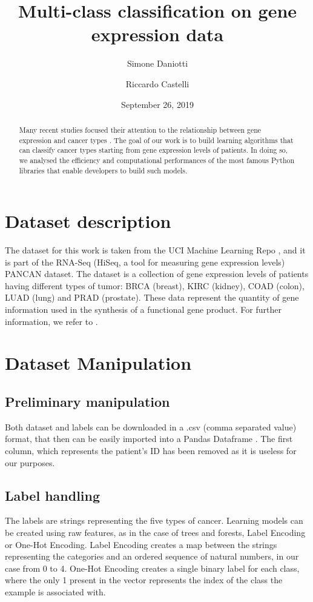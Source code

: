 \documentclass[12pt]{article}
\title{Multi-class classification on gene expression data}
\author[1]{Simone Daniotti}
\author[2]{Riccardo Castelli}
\affil[1]{Physics Department, University of Milan}
\affil[2]{Informatics Department, University of Milan}
\date{September 26, 2019}
\begin{document}
 \maketitle
  

\begin{abstract}
Many recent studies focused their attention to the relationship between gene expression and cancer types \cite{wang2018gene}. The goal of our work is to build learning algorithms that can classify cancer types starting from gene expression levels of patients. In doing so, we analysed the efficiency and computational performances of the most famous Python libraries that enable developers to build such models.
\end{abstract}


\newpage
\tableofcontents

\newpage
\section{Dataset description}

The dataset for this work is taken from the UCI Machine Learning Repo \cite{repo}, and it is part of the RNA-Seq (HiSeq, a tool for measuring gene expression levels) PANCAN dataset. The dataset is a collection of gene expression levels of patients having different types of tumor: BRCA (breast), KIRC (kidney), COAD (colon), LUAD (lung) and PRAD (prostate).
These data represent the quantity of gene information used in the synthesis of a functional gene product. 
For further information, we refer to \cite{weinstein2013cancer}.


\section{Dataset Manipulation}


\subsection{Preliminary manipulation}
Both dataset and labels can be downloaded in a .csv (comma separated value) format, that then can be easily imported into a Pandas Dataframe \cite{pandas}. The first column, which represents the patient's ID has been removed as it is useless for our purposes.


\subsection{Label handling}
The labels are strings representing the five types of cancer. Learning models can be created using raw features, as in the case of trees and forests, Label Encoding or One-Hot Encoding.
Label Encoding creates a map between the strings representing the categories and an ordered sequence of natural numbers, in our case from 0 to 4.
One-Hot Encoding creates a single binary label for each class, where the only 1 present in the vector represents the index of the class the example is associated with.  
\end{document}
